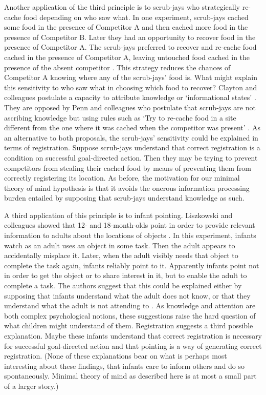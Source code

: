 \documentclass[12pt,\papersize]{extarticle}
\begin{document}
Another application of the third principle is to scrub-jays who strategically re-cache food depending on who saw what.  In one experiment, scrub-jays cached some food in the presence of Competitor A and then cached more food in the presence of Competitor B.  
Later they had an opportunity to recover food in the presence of Competitor A.  
The scrub-jays preferred to recover and re-cache food cached in the presence of Competitor A, leaving untouched food cached in the presence of the absent competitor \citep[][pp.\ 517-9]{en_1418}.  This strategy reduces the chances of Competitor A knowing where any of the scrub-jays’ food is.  What might explain this sensitivity to who saw what in choosing which food to recover?  Clayton and colleagues postulate a capacity to attribute knowledge or `informational states' \citep[]{en_1418}.  They are opposed by Penn and colleagues who postulate that scrub-jays are not ascribing knowledge but using rules such as `Try to re-cache food in a site different from the one where it was cached when the competitor was present' \citep[]{en_1417, Penn:2007ey}.  As an alternative to both proposals, the scrub-jays’ sensitivity could be explained in terms of registration.  Suppose scrub-jays understand that correct registration is a condition on successful goal-directed action.  Then they may be trying to prevent competitors from stealing their cached food by means of preventing them from correctly registering its location. As before, the motivation for our minimal theory of mind hypothesis is that it avoids the onerous information processing burden entailed by supposing that scrub-jays understand knowledge as such.    

A third application of this principle is to infant pointing.  Liszkowski and colleagues showed that 12- and 18-month-olds point in order to provide relevant information to adults about the locations of objects \citep[]{en_1093}.  In this experiment, infants watch as an adult uses an object in some task.  Then the adult appears to accidentally misplace it.  Later, when the adult visibly needs that object to complete the task again, infants reliably point to it.  Apparently infants point not in order to get the object or to share interest in it, but to enable the adult to complete a task.  The authors suggest that this could be explained either by supposing that infants understand what the adult does not know, or that they understand what the adult is not attending to \citep[][p.\ 185]{en_1093}.  As knowledge and attention are both complex psychological notions, these suggestions raise the hard question of what children might understand of them.  Registration suggests a third possible explanation.  Maybe these infants understand that correct registration is necessary for successful goal-directed action and that pointing is a way of generating correct registration.  (None of these explanations bear on what is perhaps most interesting about these findings, that infants care to inform others and do so spontaneously.  Minimal theory of mind as described here is at most a small part of a larger story.)
\end{document}
